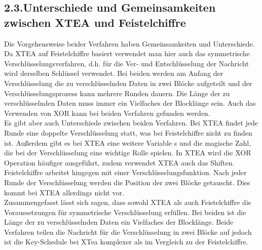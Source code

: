\documentclass[course=asp]{aspdoc}
\begin{document}
\newpage
\subsection*{2.3.Unterschiede und Gemeinsamkeiten zwischen XTEA und Feistelchiffre}
Die Vorgehensweise beider Verfahren haben Gemeinsamkeiten und Unterschiede. Da XTEA auf Feistelchiffre basiert verwendet man hier auch das symmetrische Verschlüsselungsverfahren, d.h. für die Ver- und Entschlüsselung der Nachricht wird derselben Schlüssel verwendet. Bei beiden werden am Anfang der Verschlüsselung die zu verschlüsselnden Daten in zwei Blöcke aufgeteilt und der Verschlüsselungsprozess kann mehrere Runden dauern. Die Länge der zu verschlüsselnden Daten muss immer ein Vielfaches der Blocklänge sein. Auch das Verwenden von XOR kann bei beiden Verfahren gefunden werden. \\
Es gibt aber auch Unterschiede zwischen beiden Verfahren. Bei XTEA findet jede Runde eine doppelte Verschlüsselung statt, was bei Feistelchiffre nicht zu finden ist. Außerdem gibt es bei XTEA eine weitere Variable s und die magische Zahl, die bei der Verschlüsselung eine wichtige Rolle spielen. In XTEA wird die XOR Operation häufiger ausgeführt, zudem verwendet XTEA auch das Shiften. Feistelchiffre arbeitet hingegen mit einer Verschlüsselungsfunktion. Nach jeder Runde der Verschlüsselung werden die Position der zwei Blöcke getauscht. Dies kommt bei XTEA allerdings nicht vor. \\
Zusammengefasst lässt sich sagen, dass sowohl XTEA als auch Feistelchiffre die Voraussetzungen für symmetrische Verschlüsselung erfüllen. Bei beiden ist die Länge der zu verschlüsselnden Daten ein Vielfaches der Blocklänge. Beide Verfahren teilen die Nachricht für die Verschlüsselung in zwei Blöcke auf jedoch ist die Key-Schedule bei XTea komplexer als im Vergleich zu der Feistelchiffre.
\end{document}
